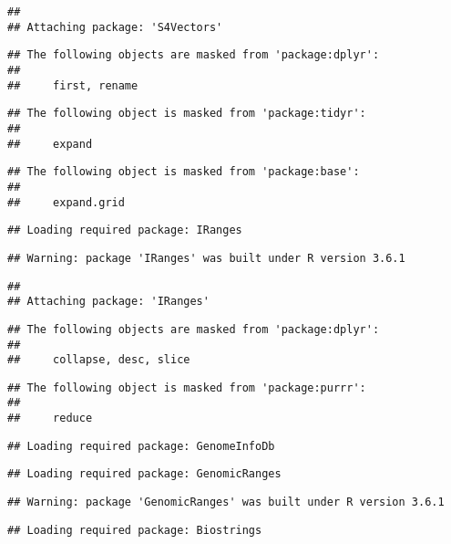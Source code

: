 \documentclass[]{article}
\begin{document}
\begin{verbatim}
## 
## Attaching package: 'S4Vectors'
\end{verbatim}

\begin{verbatim}
## The following objects are masked from 'package:dplyr':
## 
##     first, rename
\end{verbatim}

\begin{verbatim}
## The following object is masked from 'package:tidyr':
## 
##     expand
\end{verbatim}

\begin{verbatim}
## The following object is masked from 'package:base':
## 
##     expand.grid
\end{verbatim}

\begin{verbatim}
## Loading required package: IRanges
\end{verbatim}

\begin{verbatim}
## Warning: package 'IRanges' was built under R version 3.6.1
\end{verbatim}

\begin{verbatim}
## 
## Attaching package: 'IRanges'
\end{verbatim}

\begin{verbatim}
## The following objects are masked from 'package:dplyr':
## 
##     collapse, desc, slice
\end{verbatim}

\begin{verbatim}
## The following object is masked from 'package:purrr':
## 
##     reduce
\end{verbatim}

\begin{verbatim}
## Loading required package: GenomeInfoDb
\end{verbatim}

\begin{verbatim}
## Loading required package: GenomicRanges
\end{verbatim}

\begin{verbatim}
## Warning: package 'GenomicRanges' was built under R version 3.6.1
\end{verbatim}

\begin{verbatim}
## Loading required package: Biostrings
\end{verbatim}
\end{document}
